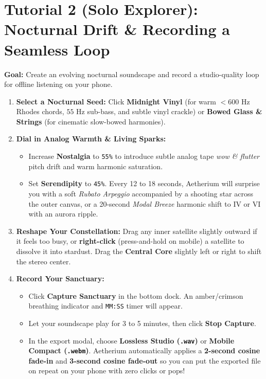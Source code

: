 \documentclass[11pt,oneside,openany]{book}
\begin{document}
\section{Tutorial 2 (Solo Explorer): Nocturnal Drift \& Recording a Seamless Loop}

\textbf{Goal:} Create an evolving nocturnal soundscape and record a studio-quality loop for offline listening on your phone.

\begin{enumerate}
  \item \textbf{Select a Nocturnal Seed:} Click \textbf{Midnight Vinyl} (for warm $<600\text{ Hz}$ Rhodes chords, $55\text{ Hz}$ sub-bass, and subtle vinyl crackle) or \textbf{Bowed Glass \& Strings} (for cinematic slow-bowed harmonies).
  \item \textbf{Dial in Analog Warmth \& Living Sparks:}
    \begin{itemize}
      \item Increase \textbf{Nostalgia} to \texttt{55\%} to introduce subtle analog tape \textit{wow \& flutter} pitch drift and warm harmonic saturation.
      \item Set \textbf{Serendipity} to \texttt{45\%}. Every 12 to 18 seconds, Aetherium will surprise you with a soft \textit{Rubato Arpeggio} accompanied by a shooting star across the outer canvas, or a 20-second \textit{Modal Breeze} harmonic shift to $\text{IV}$ or $\text{VI}$ with an aurora ripple.
    \end{itemize}
  \item \textbf{Reshape Your Constellation:} Drag any inner satellite slightly outward if it feels too busy, or \textbf{right-click} (press-and-hold on mobile) a satellite to dissolve it into stardust. Drag the \textbf{Central Core} slightly left or right to shift the stereo center.
  \item \textbf{Record Your Sanctuary:}
    \begin{itemize}
      \item Click \textbf{Capture Sanctuary} in the bottom dock. An amber/crimson breathing indicator and \texttt{MM:SS} timer will appear.
      \item Let your soundscape play for 3 to 5 minutes, then click \textbf{Stop Capture}.
      \item In the export modal, choose \textbf{Lossless Studio (\texttt{.wav})} or \textbf{Mobile Compact (\texttt{.webm})}. Aetherium automatically applies a \textbf{2-second cosine fade-in} and \textbf{3-second cosine fade-out} so you can put the exported file on repeat on your phone with zero clicks or pops!
    \end{itemize}
\end{enumerate}
\end{document}

